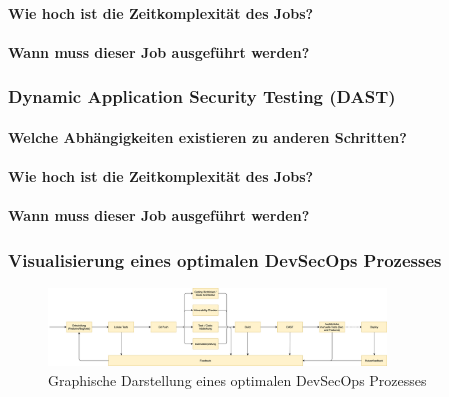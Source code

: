 \paragraph{Wie hoch ist die Zeitkomplexität des Jobs?}
\paragraph{Wann muss dieser Job ausgeführt werden?}

\subsubsection{Dynamic Application Security Testing (DAST)}\label{subsubsec:dast}
\paragraph{Welche Abhängigkeiten existieren zu anderen Schritten?}
\paragraph{Wie hoch ist die Zeitkomplexität des Jobs?}
\paragraph{Wann muss dieser Job ausgeführt werden?}


\subsubsection{Visualisierung eines optimalen DevSecOps Prozesses}
\begin{figure}[H]
    \includegraphics[width=0.8\textwidth]{img/DevOpsWorkflow}
    \centering
    \caption{Graphische Darstellung eines optimalen DevSecOps Prozesses}
    \label{fig:devSecOpsProcess}
\end{figure}